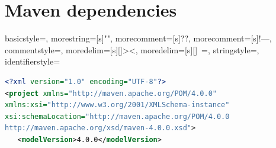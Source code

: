 \section*{Maven dependencies}
\label{sec:maven}
{
	basicstyle=\ttfamily,
	morestring=[s]{"}{"},
	morecomment=[s]{?}{?},
	morecomment=[s]{!--}{--},
	commentstyle=\color{darkgreen},
	moredelim=[s][\color{black}]{>}{<},
	moredelim=[s][\color{red}]{\ }{=},
	stringstyle=\color{blue},
	identifierstyle=\color{maroon}
}

\begin{lstlisting}[language=XML, frame=htrbl, caption={Implementation of {\ttfamily pom.xml}}, label={lst:maven}, basicstyle=\footnotesize]
<?xml version="1.0" encoding="UTF-8"?>
<project xmlns="http://maven.apache.org/POM/4.0.0"
xmlns:xsi="http://www.w3.org/2001/XMLSchema-instance"
xsi:schemaLocation="http://maven.apache.org/POM/4.0.0
http://maven.apache.org/xsd/maven-4.0.0.xsd">
   <modelVersion>4.0.0</modelVersion>


\end{lstlisting}
